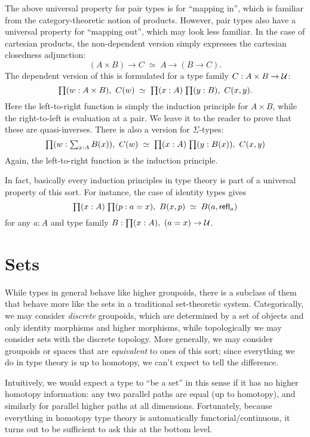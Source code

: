 The above universal property for pair types is for ``mapping in'', which is familiar from the category-theoretic notion of products.
However, pair types also have a universal property for ``mapping out'', which may look less familiar.
In the case of cartesian products, the non-dependent version simply expresses the cartesian closedness adjunction:
\[ (A\times B) \to C \;\simeq\; A\to (B\to C).\]
The dependent version of this is formulated for a type family $C:A\times B\to \mathcal{U}$:
\[ \prd{w:A\times B} C(w) \;\simeq\; \prd{x:A}{y:B} C(x,y). \]
Here the left-to-right function is simply the induction principle for $A\times B$, while the right-to-left is evaluation at a pair.
We leave it to the reader to prove that these are quasi-inverses.
There is also a version for $\Sigma$-types:
\begin{equation}
  \prd{w:\textstyle\sum_{x:A} B(x)} C(w) \;\simeq\; \prd{x:A}{y:B(x)} C(x,y)\label{eq:sigma-lump}
\end{equation}
Again, the left-to-right function is the induction principle.

In fact, basically every induction principles in type theory is part of a universal property of this sort.
For instance, the case of identity types gives
\begin{equation}
  \label{eq:path-lump}
  \prd{x:A}{p:a=x} B(x,p) \;\simeq\; B(a,\refl a)
\end{equation}
for any $a:A$ and type family $B:\prd{x:A} (a=x) \to\type$.


\section{Sets}
\label{sec:basics-sets}

While types in general behave like higher groupoids, there is a subclass of them that behave more like the sets in a traditional set-theoretic system.
Categorically, we may consider \emph{discrete} groupoids, which are determined by a set of objects and only identity morphisms and higher morphisms, while topologically we may consider sets with the discrete topology.
More generally, we may consider groupoids or spaces that are \emph{equivalent} to ones of this sort; since everything we do in type theory is up to homotopy, we can't expect to tell the difference.

Intuitively, we would expect a type to ``be a set'' in this sense if it has no higher homotopy information: any two parallel paths are equal (up to homotopy), and similarly for parallel higher paths at all dimensions.
Fortunately, because everything in homotopy type theory is automatically functorial/continuous, it turns out to be sufficient to ask this at the bottom level.

